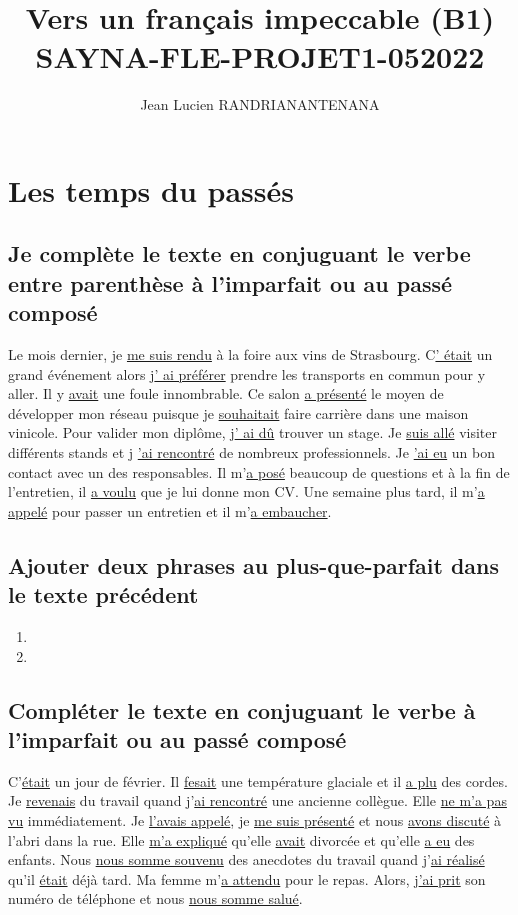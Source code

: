 \documentclass[12pt]{article}
\author{Jean Lucien RANDRIANANTENANA}
\title{Vers un français
impeccable (B1)\\SAYNA-FLE-PROJET1-052022}
\newcommand{\und}[1]{\underline{#1}}
\begin{document}
\maketitle
\tableofcontents
\newpage
\section{Les temps du passés}
\subsection{Je complète le texte en conjuguant le verbe entre parenthèse à l'imparfait ou au passé composé}
Le mois dernier, je \und{me suis rendu} à la foire aux vins de Strasbourg. C\und{' était} un grand événement
alors j\und{' ai préférer} prendre les transports en commun pour y aller. Il y \und{avait} une foule
innombrable. Ce salon  \und{a présenté} le moyen de développer mon réseau puisque je \und{souhaitait} faire carrière dans une maison vinicole.
Pour valider mon diplôme, j\und{' ai dû} trouver un stage. Je \und{suis allé} visiter différents stands et j
\und{'ai rencontré} de nombreux professionnels. Je \und{'ai eu} un bon contact avec un des responsables.
Il m'\und{a posé} beaucoup de questions et à la fin de l’entretien, il \und{a voulu} que je lui donne mon
CV. Une semaine plus tard, il m'\und{a appelé} pour passer un entretien et il m'\und{a embaucher}.
\subsection{Ajouter deux phrases au plus-que-parfait dans le texte précédent}
\begin{enumerate}
	\item
	\item
\end{enumerate}

\subsection{Compléter le texte en conjuguant le verbe à l’imparfait ou au passé composé}

C'\und{était} un jour de février. Il \und{fesait} une température glaciale et il \und{a plu} des cordes.
Je \und{revenais} du travail quand j'\und{ai rencontré} une ancienne collègue. Elle \und{ne m'a pas vu} immédiatement.
Je \und{l'avais appelé}, je \und{me suis présenté} et nous \und{avons discuté} à l’abri dans la rue.
Elle \und{m'a expliqué} qu’elle \und{avait} divorcée et qu’elle \und{a eu} des enfants. Nous \und{nous somme souvenu} des anecdotes du travail quand j'\und{ai réalisé} qu’il \und{était} déjà tard.
Ma femme m'\und{a attendu} pour le repas. Alors, j\und{'ai prit} son numéro de téléphone et nous \und{nous somme salué}.
\end{document}
